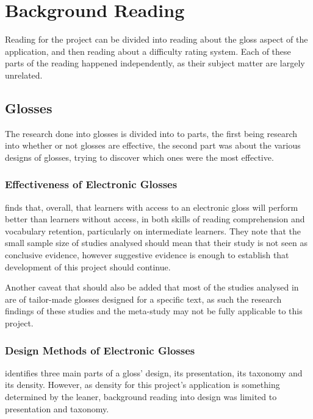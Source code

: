 \chapter{Background Reading}

Reading for the project can be divided into reading about the gloss aspect of the application, and then reading about a difficulty rating system. Each of these parts of the reading happened independently, as their subject matter are largely unrelated.


\section{Glosses}

The research done into glosses is divided into to parts, the first being research into whether or not glosses are effective, the second part was about the various designs of glosses, trying to discover which ones were the most effective.

\subsection{Effectiveness of Electronic Glosses}

\textcite{abraham2008} finds that, overall, that learners with access to an electronic gloss will perform better than learners without access, in both skills of reading comprehension and vocabulary retention, particularly on intermediate learners. They note that the small sample size of studies analysed should mean that their study is not seen as conclusive evidence, however suggestive evidence is enough to establish that development of this project should continue.

Another caveat that should also be added that most of the studies analysed in \textcite{abraham2008} are of tailor-made glosses designed for a specific text, as such the research findings of these studies and the meta-study may not be fully applicable to this project.


\subsection{Design Methods of Electronic Glosses}

\textcite{roby1999} identifies three main parts of a gloss' design, its presentation, its taxonomy and its density. However, as density for this project's application is something determined by the leaner, background reading into design was limited to presentation and taxonomy. 

